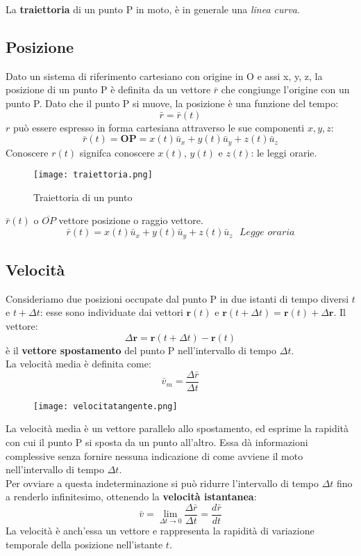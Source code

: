 \documentclass[../../main.tex]{subfiles}
\begin{document}
La \textbf{traiettoria} di un punto P in moto, è in generale una \textit{linea curva}.
\subsection{Posizione}
Dato un sistema di riferimento cartesiano con origine in O e assi x, y, z, la posizione di un punto P è definita da un vettore $\bar{r}$ che congiunge l'origine con un punto P. Dato che il punto P si muove, la posizione è una funzione del tempo:
\[ \bar{r} = \bar{r}(t) \]
$r$ può essere espresso in forma cartesiana attraverso le sue componenti $x, y, z$:
\[ \bar{r}(t) = \textbf{OP} = x(t)\bar{u}_x + y(t)\bar{u}_y + z(t)\bar{u}_z \]
Conoscere $r(t)$ signifca conoscere $x(t)$, $y(t)$ e $z(t)$: le leggi orarie.

\begin{figure}[h!]
    \centering
    \texttt{[image: traiettoria.png]}
    \caption{Traiettoria di un punto}
\end{figure}
$\bar{r}(t)$ o $\overline{OP}$ vettore posizione o raggio vettore.
\[
    \bar r(t) = x(t)\bar{u}_x + y(t)\bar{u}_y + z(t)\bar{u}_z \ \ \ \textit{Legge oraria}
\]

\subsection{Velocità}
Consideriamo due posizioni occupate dal punto P in due istanti di tempo diversi $t$ e $t + \Delta t$: esse sono individuate dai vettori $\textbf{r}(t)$ e $\textbf{r}(t + \Delta t) = \textbf{r}(t) + \Delta \textbf{r}$. Il vettore:
\[ \Delta \textbf{r} = \textbf{r}(t + \Delta t) - \textbf{r}(t) \]
è il \textbf{vettore spostamento} del punto P nell'intervallo di tempo $\Delta t$.\\
La velocità media è definita come:
\[ \bar{v}_m = \dfrac{\Delta \bar{r}}{\Delta t} \]
\begin{figure}[h!]
    \centering
    \texttt{[image: velocitatangente.png]}
    \label{fig:velocitatangente}
\end{figure}
La velocità media è un vettore parallelo allo spostamento, ed esprime la rapidità con cui il punto P si sposta da un punto all'altro.
Essa dà informazioni complessive senza fornire nessuna indicazione di come avviene il moto nell'intervallo di tempo $\Delta t$.\\
Per ovviare a questa indeterminazione si può ridurre l'intervallo di tempo $\Delta t$ fino a renderlo infinitesimo, ottenendo la \textbf{velocità istantanea}:
\[ \bar{v} = \lim_{\Delta t \to 0} \dfrac{\Delta \bar{r}}{\Delta t} = \dfrac{d\bar{r}}{dt} \]
La velocità è anch'essa un vettore e rappresenta la rapidità di variazione temporale della posizione nell'istante $t$.
\end{document}
